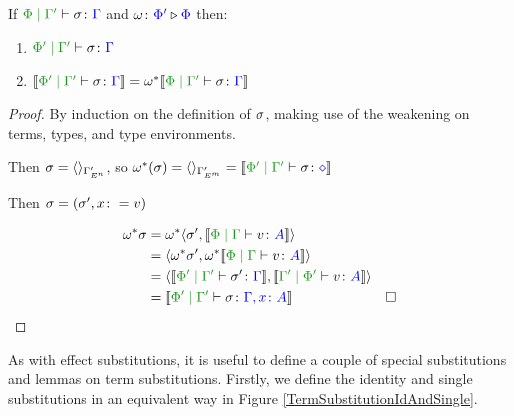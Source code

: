 \begin{framed}
    \begin{theorem}\label{EffectWeakeningOnTermSubstitution}
        If $\etyperelation{\P}{\G'}{\si}{\G}$ and $\omega \colon {\color{blue}\Phi'} \triangleright {\color {blue} \Phi}$ then:
        
        \begin{enumerate}[label=\roman*.]
            \item $\etyperelation{\P'}{\G'}{\si}{\G}$
            \item $\deno{\etyperelation{\P'}{\G'}{\si}{\G}} = \w\star\deno{\etyperelation{\P}{\G'}{\si}{\G}}$
        \end{enumerate}
    \end{theorem}
    
    
    \begin{proof}
        By induction on the definition of $\sigma$, making use of the weakening on terms, types, and type environments.
    
        \case{\tsubnil}
        Then $\sigma = \langle\rangle_{\Gamma'_{E^n}}$, so $\w\star(\si) = \term{\G'_{E^m}} = \deno{\etyperelation{\P'}{\G'}{\si}{\nil}}$
        
        \case{\tsubextend}
        Then $\sigma = (\sigma',x\colon= v)$
        
        \begin{align*}
            \w\star\si & = \w\star\pr{\si'}{\deno{\gpetyperelation{v}{A}}}\\
            & = \pr{\w\star\si'}{\w\star\deno{\gpetyperelation{v}{A}}}\\
            &=\pr{\deno{\etyperelation{\P'}{\G'}{\si'}{\G}}}{\deno{\etyperelation{\G'}{\P'}{v}{A}}}\\
            &=\deno{\etyperelation{\P'}{\G'}{\si}{\gax}} & \square
        \end{align*}
    \end{proof}
\end{framed}

As with effect substitutions, it is useful to define a couple of special substitutions and lemmas on term substitutions. Firstly, we define the identity and single substitutions in an equivalent way in Figure \ref{TermSubstitutionIdAndSingle}.

